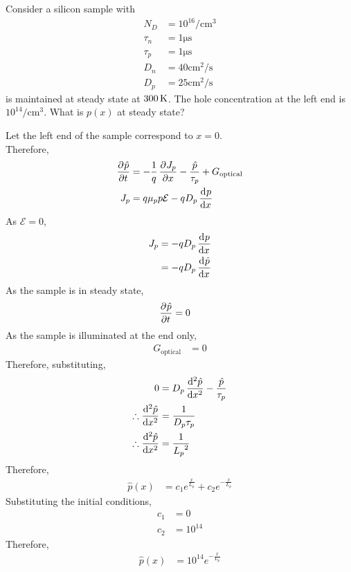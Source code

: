 \documentclass[titlepage, fleqn, a4paper, 12pt, twoside]{article}
\theoremstyle{definition}
\theoremstyle{theorem}
\begin{document}
\begin{question}
	Consider a silicon sample with
	\begin{align*}
		N_D &= 10^{16} \si{\per\centi\metre\cubed}\\
		\tau_n &= 1 \si{\micro\second}\\
		\tau_p &= 1 \si{\micro\second}\\
		D_n &= 40 \si{\centi\metre\squared\per\second}\\
		D_p &= 25 \si{\centi\metre\squared\per\second}
	\end{align*}
	is maintained at steady state at $300 \kelvin$.
	The hole concentration at the left end is $10^{14} \si{\per\centi\metre\cubed}$.
	What is $p(x)$ at steady state?
\end{question}

\begin{solution}
	Let the left end of the sample correspond to $x = 0$.\\
	Therefore,
	\begin{align*}
		\dpd{\hat{p}}{t} &= -\frac{1}{q} \dpd{J_p}{x} - \frac{\hat{p}}{\tau_p} + G_{\text{optical}}\\
		J_p &= q \mu_p p \mathcal{E} - q D_p \dod{p}{x}
	\end{align*}
	As $\mathcal{E} = 0$,
	\begin{align*}
		J_p &= -q D_p \dod{p}{x}\\
		&= -q D_p \dod{\hat{p}}{x}
	\end{align*}
	As the sample is in steady state,
	\begin{align*}
		\dpd{\hat{p}}{t} &= 0
	\end{align*}
	As the sample is illuminated at the end only,
	\begin{align*}
		G_{\text{optical}} &= 0
	\end{align*}
	Therefore, substituting,
	\begin{align*}
		0 &= D_p \dod[2]{\hat{p}}{x} - \frac{\hat{p}}{\tau_p}\\
		\therefore \dod[2]{\hat{p}}{x} &= \frac{1}{D_p \tau_p}\\
		\therefore \dod[2]{\hat{p}}{x} &= \frac{1}{{L_p}^2}\\
	\end{align*}
	Therefore,
	\begin{align*}
		\hat{p}(x) &= c_1 e^{\frac{x}{L_p}} + c_2 e^{-\frac{x}{L_p}}
	\end{align*}
	Substituting the initial conditions,
	\begin{align*}
		c_1 &= 0\\
		c_2 &= 10^{14}
	\end{align*}
	Therefore,
	\begin{align*}
		\hat{p}(x) &= 10^{14} e^{-\frac{x}{L_p}}
	\end{align*}
\end{solution}
\end{document}
